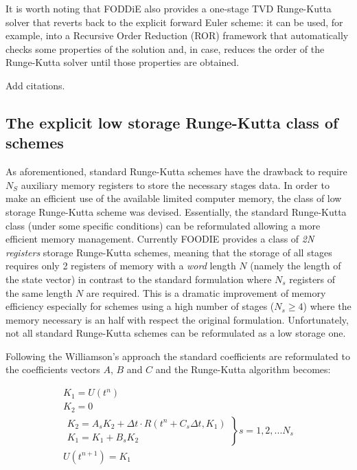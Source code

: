 It is worth noting that FODDiE also provides a one-stage TVD Runge-Kutta solver that reverts back to the explicit forward Euler scheme: it can be used, for example, into a Recursive Order Reduction (ROR) framework that automatically checks some properties of the solution and, in case, reduces the order of the Runge-Kutta solver until those properties are obtained.

{\color{red} Add citations.}

\subsection{The explicit low storage Runge-Kutta class of schemes}

As aforementioned, standard Runge-Kutta schemes have the drawback to require $N_S$ auxiliary memory registers to store the necessary stages data. In order to make an efficient use of the available limited computer memory, the class of low storage Runge-Kutta scheme was devised. Essentially, the standard Runge-Kutta class (under some specific conditions) can be reformulated allowing a more efficient memory management. Currently FOODIE provides a class of \emph{2N registers} storage Runge-Kutta schemes, meaning that the storage of all stages requires only 2 registers of memory with a \emph{word} length $N$ (namely the length of the state vector) in contrast to the standard formulation where $N_s$ registers of the same length $N$ are required. This is a dramatic improvement of memory efficiency especially for schemes using a high number of stages ($N_s \ge 4$) where the memory necessary is an half with respect the original formulation. Unfortunately, not all standard Runge-Kutta schemes can be reformulated as a low storage one.

Following the Williamson's approach the standard coefficients are reformulated to the coefficients vectors $A$, $B$ and $C$ and the Runge-Kutta algorithm becomes:

\begin{equation}
\begin{matrix}
  K_1 = U\left(t^n\right) \\
  K_2 = 0 \\
  \left.\begin{matrix}
    K_2 = A_s K_2 + \Delta t \cdot R\left(t^n + C_s \Delta t, K_1\right) \\
    K_1 = K_1 + B_s K_2
  \end{matrix}\right\} s=1,2,...N_s\\
  U\left(t^{n+1}\right) = K_1
  \end{matrix}
\label{eq:RK-ls}
\end{equation}

